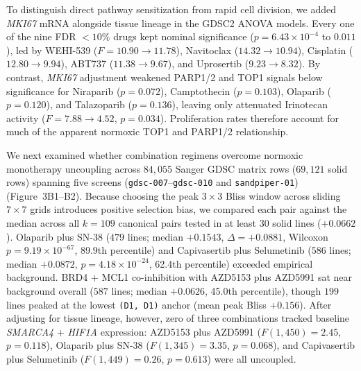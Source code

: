 \documentclass[10pt,twocolumn]{article}
\begin{document}
To distinguish direct pathway sensitization from rapid cell division, we added \textit{MKI67} mRNA alongside tissue lineage in the GDSC2 ANOVA models. Every one of the nine FDR $< 10\%$ drugs kept nominal significance ($p = 6.43 \times 10^{-4}$ to $0.011$), led by WEHI-539 ($F = 10.90 \rightarrow 11.78$), Navitoclax ($14.32 \rightarrow 10.94$), Cisplatin ($12.80 \rightarrow 9.94$), ABT737 ($11.38 \rightarrow 9.67$), and Uprosertib ($9.23 \rightarrow 8.32$). By contrast, \textit{MKI67} adjustment weakened PARP1/2 and TOP1 signals below significance for Niraparib ($p = 0.072$), Camptothecin ($p = 0.103$), Olaparib ($p = 0.120$), and Talazoparib ($p = 0.136$), leaving only attenuated Irinotecan activity ($F = 7.88 \rightarrow 4.52$, $p = 0.034$). Proliferation rates therefore account for much of the apparent normoxic TOP1 and PARP1/2 relationship.

We next examined whether combination regimens overcome normoxic monotherapy uncoupling across $84,055$ Sanger GDSC matrix rows ($69,121$ solid rows) spanning five screens (\texttt{gdsc-007}--\texttt{gdsc-010} and \texttt{sandpiper-01}) \cite{jaaks2022,bashi2024} (Figure~3B1--B2). Because choosing the peak $3 \times 3$ Bliss window across sliding $7 \times 7$ grids introduces positive selection bias, we compared each pair against the median across all $k = 109$ canonical pairs tested in at least 30 solid lines ($+0.0662$). Olaparib plus SN-38 ($479$ lines; median $+0.1543$, $\Delta = +0.0881$, Wilcoxon $p = 9.19 \times 10^{-67}$, 89.9th percentile) and Capivasertib plus Selumetinib ($586$ lines; median $+0.0872$, $p = 4.18 \times 10^{-24}$, 62.4th percentile) exceeded empirical background. BRD4 + MCL1 co-inhibition with AZD5153 plus AZD5991 sat near background overall ($587$ lines; median $+0.0626$, 45.0th percentile), though $199$ lines peaked at the lowest \texttt{(D1, D1)} anchor (mean peak Bliss $+0.156$). After adjusting for tissue lineage, however, zero of three combinations tracked baseline \textit{SMARCA4} + \textit{HIF1A} expression: AZD5153 plus AZD5991 ($F(1, 450) = 2.45$, $p = 0.118$), Olaparib plus SN-38 ($F(1, 345) = 3.35$, $p = 0.068$), and Capivasertib plus Selumetinib ($F(1, 449) = 0.26$, $p = 0.613$) were all uncoupled.
\end{document}
